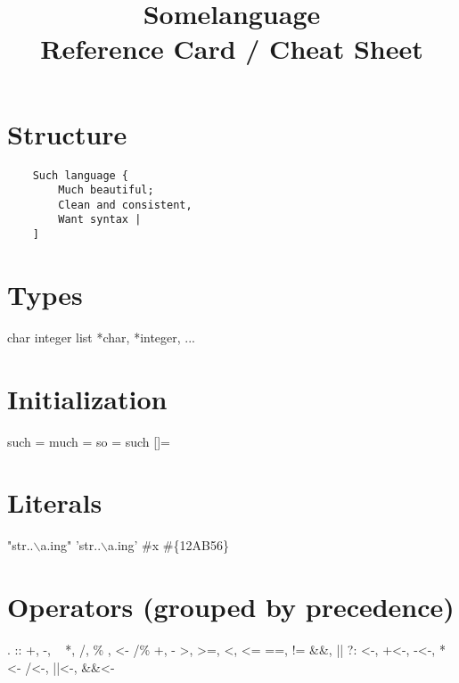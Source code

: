 \documentclass{refcard}
\title{Somelanguage\\Reference Card / Cheat Sheet}
\begin{document}
\maketitle

\section{Structure}

\begin{verbatim}
	Such language {
	    Much beautiful;
	    Clean and consistent,
	    Want syntax |
	]
\end{verbatim}


\section{Types}

\begin{ldesc}
	\li[char]    char
	\li[integer] integer
	\li[list]    list
	\li[pointer] *char, *integer, ...
\end{ldesc}


\section{Initialization}

\begin{ldesc}
	     such  =
	    much  =
	  so    =
	\li[lists]              such  []=
\end{ldesc}


\section{Literals}

\begin{ldesc}
	    "str..$\backslash{}$a.ing"
	 'str..$\backslash{}$a.ing'
	\li[Character]              \#x
	    \#\{12AB56\}
\end{ldesc}


\section{Operators (grouped by precedence)}

\begin{Ldesc}
	 .
	 ::
	 +, -, ~
	 *, /, \%
	 , <-  /\% 
	 +, -
	\Li[comparisons                  ] >, >=, <, <=
	\Li[comparisons                  ] ==, !=
	\Li[and, or                      ] \&\&, ||
	 ?:
	\Li[assignments                  ] <-, +<-, -<-, *<-
	\li                                /<-, ||<-, \&\&<-
\end{Ldesc}
\end{document}

